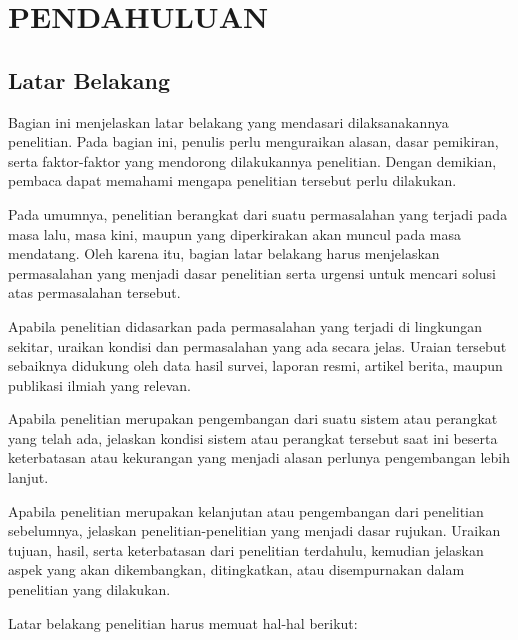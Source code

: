 \chapter{\MakeUppercase{Pendahuluan}}
\section{Latar Belakang}
Bagian ini menjelaskan latar belakang yang mendasari dilaksanakannya penelitian. Pada bagian ini, penulis perlu menguraikan alasan, dasar pemikiran, serta faktor-faktor yang mendorong dilakukannya penelitian. Dengan demikian, pembaca dapat memahami mengapa penelitian tersebut perlu dilakukan.

Pada umumnya, penelitian berangkat dari suatu permasalahan yang terjadi pada masa lalu, masa kini, maupun yang diperkirakan akan muncul pada masa mendatang. Oleh karena itu, bagian latar belakang harus menjelaskan permasalahan yang menjadi dasar penelitian serta urgensi untuk mencari solusi atas permasalahan tersebut.

Apabila penelitian didasarkan pada permasalahan yang terjadi di lingkungan sekitar, uraikan kondisi dan permasalahan yang ada secara jelas. Uraian tersebut sebaiknya didukung oleh data hasil survei, laporan resmi, artikel berita, maupun publikasi ilmiah yang relevan.

Apabila penelitian merupakan pengembangan dari suatu sistem atau perangkat yang telah ada, jelaskan kondisi sistem atau perangkat tersebut saat ini beserta keterbatasan atau kekurangan yang menjadi alasan perlunya pengembangan lebih lanjut.

Apabila penelitian merupakan kelanjutan atau pengembangan dari penelitian sebelumnya, jelaskan penelitian-penelitian yang menjadi dasar rujukan. Uraikan tujuan, hasil, serta keterbatasan dari penelitian terdahulu, kemudian jelaskan aspek yang akan dikembangkan, ditingkatkan, atau disempurnakan dalam penelitian yang dilakukan.

Latar belakang penelitian harus memuat hal-hal berikut:


